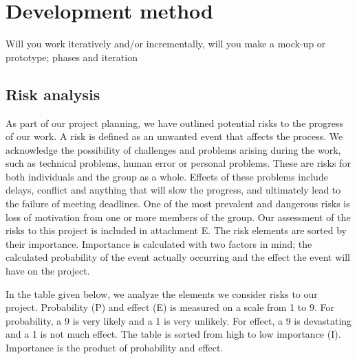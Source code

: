 \section{Development method}
Will you work iteratively and/or incrementally, will you make a 
mock-up or prototype; phases and iteration



\subsection{Risk analysis}
As part of our project planning, we have outlined potential risks to the progress of our work. A risk
is defined as an unwanted event that affects the process. We acknowledge the possibility of challenges and problems arising during the work, such as technical problems, human error or personal problems. These are risks for both individuals and the group as a whole. Effects of these problems include delays, conflict and anything that will slow the progress, and ultimately lead to the failure of meeting deadlines. One of the most prevalent and dangerous risks is loss of motivation from one or more members of the group. Our assessment of the risks to this project is included in attachment E. The risk elements are sorted by their importance. Importance is calculated with two factors in mind; the calculated probability of the event actually occurring and the effect the event will have on the project. 

In the table given below, we analyze the elements we consider risks to our project. Probability (P) and effect (E) is measured on a scale from 1 to 9. For probability, a 9 is very likely and a 1 is very unlikely. For effect, a 9 is devastating and a 1 is not much effect. The table is sorted from high to low importance (I). Importance is the product of probability and effect. 



